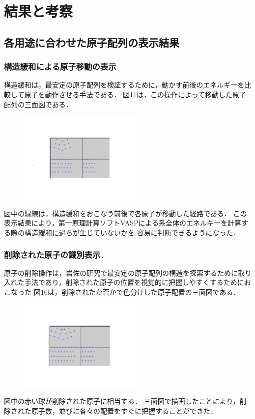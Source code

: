 
\section{結果と考察}
\subsection{各用途に合わせた原子配列の表示結果}
\subsubsection{構造緩和による原子移動の表示}
構造緩和は，最安定の原子配列を検証するために，動かす前後のエネルギーを比較して原子を動作させる手法である．
図11は，この操作によって移動した原子配列の三面図である．

\begin{figure}[htbp]\begin{center}
\includegraphics[width=6cm,bb=0 0 442 432]{../figs/./boundary_narita.010.jpg}
\caption{}
\label{default}\end{center}\end{figure}
図中の緑線は，構造緩和をおこなう前後で各原子が移動した経路である．
この表示結果により，第一原理計算ソフトVASPによる系全体のエネルギーを計算する際の構造緩和に過ちが生じていないかを
容易に判断できるようになった．

\subsubsection{削除された原子の識別表示．}
原子の削除操作は，岩佐の研究で最安定の原子配列の構造を探索するために取り入れた手法であり，削除された原子の位置を視覚的に把握しやすくするためにおこなった
図10は，削除されたか否かで色分けした原子配置の三面図である．

\begin{figure}[htbp]\begin{center}
\includegraphics[width=6cm,bb=0 0 442 432]{../figs/./boundary_narita.011.jpg}
\caption{}
\label{default}\end{center}\end{figure}
図中の赤い球が削除された原子に相当する．
三面図で描画したことにより，削除された原子数，並びに各々の配置をすぐに把握することができた．

